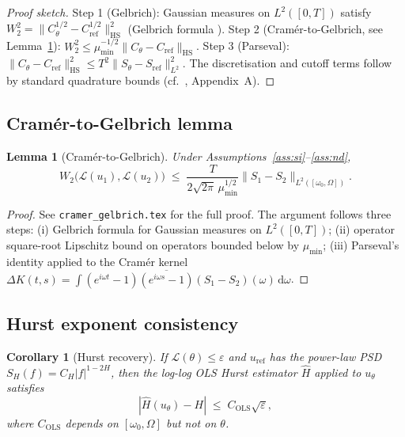 \documentclass[11pt,a4paper]{article}
\newtheorem{lemma}[theorem]{Lemma}
\newtheorem{corollary}[theorem]{Corollary}
\newcommand{\HS}{\mathrm{HS}}
\begin{document}
\begin{proof}[Proof sketch]
 Step 1 (Gelbrich): Gaussian measures on $L^2([0,T])$ satisfy
 $W_2^2 = \|C_\theta^{1/2} - C_{\mathrm{ref}}^{1/2}\|_\HS^2$
 (Gelbrich formula \citep{gelbrich1990formula}).
 Step 2 (Cramér-to-Gelbrich, see Lemma~\ref{lem:cramer-gelbrich}):
 $W_2^2 \leq \mu_{\min}^{-1/2}\|C_\theta - C_{\mathrm{ref}}\|_\HS$.
 Step 3 (Parseval): $\|C_\theta - C_{\mathrm{ref}}\|_\HS^2 \leq
 T^2 \|S_\theta - S_{\mathrm{ref}}\|_{L^2}^2$.
 The discretisation and cutoff terms follow by standard quadrature
 bounds (cf.\ \citet{TODO-paper1}, Appendix~A).
\end{proof}

\subsection{Cramér-to-Gelbrich lemma}

\begin{lemma}[Cramér-to-Gelbrich]\label{lem:cramer-gelbrich}
 Under Assumptions~\ref{ass:si}--\ref{ass:nd},
 \[
  W_2\!\bigl(\mathcal{L}(u_1), \mathcal{L}(u_2)\bigr)
  \;\leq\;
  \frac{T}{2\sqrt{2\pi}\,\mu_{\min}^{1/2}}
  \bigl\|S_1 - S_2\bigr\|_{L^2([\omega_0,\Omega])}.
 \]
\end{lemma}

\begin{proof}
 See \texttt{cramer\_gelbrich.tex} for the full proof. The argument
 follows three steps: (i) Gelbrich formula for Gaussian measures on
 $L^2([0,T])$; (ii) operator square-root Lipschitz bound on operators
 bounded below by $\mu_{\min}$; (iii) Parseval's identity applied to
 the Cramér kernel $\Delta K(t,s) = \int (e^{i\omega t}-1)
 \overline{(e^{i\omega s}-1)} (S_1-S_2)(\omega)\,\mathrm{d}\omega$.
\end{proof}

\subsection{Hurst exponent consistency}

\begin{corollary}[Hurst recovery]\label{cor:hurst}
 If $\mathcal{L}(\theta) \leq \varepsilon$ and $u_{\mathrm{ref}}$
 has the power-law PSD $S_H(f) = C_H|f|^{1-2H}$, then the
 log-log OLS Hurst estimator $\hat{H}$ applied to $u_\theta$
 satisfies
 \[
  |\hat{H}(u_\theta) - H| \;\leq\; C_{\mathrm{OLS}}\sqrt{\varepsilon},
 \]
 where $C_{\mathrm{OLS}}$ depends on $[\omega_0, \Omega]$ but not on $\theta$.
\end{corollary}
\end{document}
